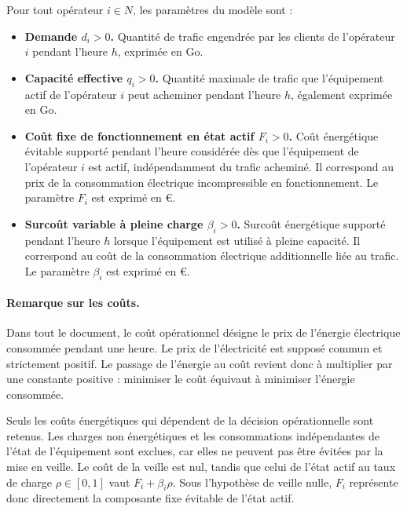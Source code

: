 \begin{definition}
Pour tout opérateur \(i\in N\), les paramètres du modèle sont :
\begin{itemize}
    \item \textbf{Demande \(d_i > 0\).}
    Quantité de trafic engendrée par les clients de l'opérateur \(i\)
    pendant l'heure \(h\), exprimée en \(\mathrm{Go}\).

    \item \textbf{Capacité effective \(q_i>0\).}
    Quantité maximale de trafic que l'équipement actif de l'opérateur
    \(i\) peut acheminer pendant l'heure \(h\), également exprimée en
    \(\mathrm{Go}\).

    \item \textbf{Coût fixe de fonctionnement en état actif \(F_i>0\).}
    Coût énergétique évitable supporté pendant l'heure considérée dès
    que l'équipement de l'opérateur \(i\) est actif, indépendamment du
    trafic acheminé. Il correspond au prix de la consommation électrique
    incompressible en fonctionnement. Le paramètre \(F_i\) est exprimé en
    \(\text{€}\).

    \item \textbf{Surcoût variable à pleine charge \(\beta_i>0\).}
    Surcoût énergétique supporté pendant l'heure \(h\) lorsque l'équipement
    est utilisé à pleine capacité. Il correspond au coût de la consommation
    électrique additionnelle liée au trafic.
    Le paramètre \(\beta_i\) est exprimé en \(\text{€}\).
\end{itemize}

\paragraph{Remarque sur les coûts.}
Dans tout le document, le coût opérationnel désigne le prix de l'énergie
électrique consommée pendant une heure. Le prix de l'électricité est supposé
commun et strictement positif. Le passage de l'énergie au coût revient donc à
multiplier par une constante positive : minimiser le coût équivaut à minimiser
l'énergie consommée.

Seuls les coûts énergétiques qui dépendent de la décision opérationnelle
sont retenus. Les charges non énergétiques et les consommations indépendantes
de l'état de l'équipement sont exclues, car elles ne peuvent pas être évitées
par la mise en veille. Le coût de la veille est nul, tandis que celui de l'état
actif au taux de charge \(\rho\in[0,1]\) vaut \(F_i+\beta_i\rho\). Sous
l'hypothèse de veille nulle, \(F_i\) représente donc directement la composante
fixe évitable de l'état actif.


\end{definition}
